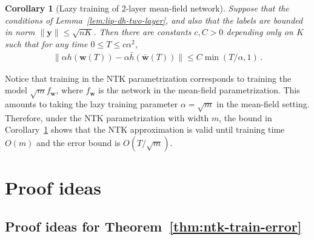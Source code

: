 \documentclass[11pt]{article} %
\newcommand{\<}{\langle}
\renewcommand{\>}{\rangle}
\def\bw{{\boldsymbol w}}
\def\by{{\boldsymbol y}}
\theoremstyle{plain}
\newtheorem{corollary}[theorem]{Corollary}
\theoremstyle{definition}
\theoremstyle{remark}
\begin{document}
\begin{corollary}[Lazy training of 2-layer mean-field network]\label{cor:mean-field-2-layer}
Suppose that the conditions of Lemma~\ref{lem:lip-dh-two-layer}, and also that the labels are bounded in norm $\|\by\| \leq \sqrt{nK}$. Then there are constants $c,C > 0$ depending only on $K$ such that for any time $0 \leq T \leq c \alpha^2$,
\begin{align*}
\|\alpha h(\bw(T)) - \alpha \bar{h}(\bar{\bw}(T))\| \leq C \min(T/\alpha,1) \,.
\end{align*}
\end{corollary}

Notice that training in the NTK parametrization corresponds to training the model $\sqrt{m} f_{\bw}$, where $f_{\bw}$ is the network in the mean-field parametrization. This amounts to taking the lazy training parameter $\alpha = \sqrt{m}$ in the mean-field setting. Therefore, under the NTK parametrization with width $m$, the bound in Corollary~\ref{cor:mean-field-2-layer} shows that the NTK approximation is valid until training time $O(m)$ and the error bound is $O(T/\sqrt{m})$.



\section{Proof ideas}
\subsection{Proof ideas for Theorem~\ref{thm:ntk-train-error}}
\end{document}
